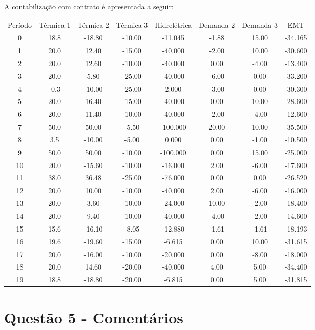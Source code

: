 \documentclass[a4paper,12pt,twoside]{article}
\begin{document}
A contabilização com contrato é apresentada a seguir:
\begin{center}
    \begin{tabular}{ c c c c c c c c }
        Período & Térmica 1  & Térmica 2  & Térmica 3  & Hidrelétrica  & Demanda 2  & Demanda 3 & EMT \\
        0    & 18.8   & -18.80   & -10.00  & -11.045   & -1.88   & 15.00 & -34.165 \\
        1    & 20.0    & 12.40   & -15.00  & -40.000   & -2.00   & 10.00 & -30.600 \\
        2    & 20.0    & 12.60   & -10.00  & -40.000    & 0.00   & -4.00 & -13.400 \\
        3    & 20.0     & 5.80   & -25.00  & -40.000   & -6.00    & 0.00 & -33.200 \\
        4    & -0.3   & -10.00   & -25.00    & 2.000   & -3.00    & 0.00 & -30.300 \\
        5    & 20.0    & 16.40   & -15.00  & -40.000    & 0.00   & 10.00 & -28.600 \\
        6    & 20.0    & 11.40   & -10.00  & -40.000   & -2.00   & -4.00 & -12.600 \\
        7    & 50.0    & 50.00    & -5.50 & -100.000   & 20.00   & 10.00 & -35.500 \\
        8     & 3.5   & -10.00    & -5.00    & 0.000    & 0.00   & -1.00 & -10.500 \\
        9    & 50.0    & 50.00   & -10.00 & -100.000    & 0.00   & 15.00 & -25.000 \\
        10   & 20.0   & -15.60   & -10.00  & -16.000    & 2.00   & -6.00 & -17.600 \\
        11   & 38.0    & 36.48   & -25.00  & -76.000    & 0.00    & 0.00 & -26.520 \\
        12   & 20.0    & 10.00   & -10.00  & -40.000    & 2.00   & -6.00 & -16.000 \\
        13   & 20.0     & 3.60   & -10.00  & -24.000   & 10.00   & -2.00 & -18.400 \\
        14   & 20.0     & 9.40   & -10.00  & -40.000   & -4.00   & -2.00 & -14.600 \\
        15   & 15.6   & -16.10    & -8.05  & -12.880   & -1.61   & -1.61 & -18.193 \\
        16   & 19.6   & -19.60   & -15.00   & -6.615    & 0.00   & 10.00 & -31.615 \\
        17   & 20.0   & -16.00   & -10.00  & -20.000    & 0.00   & -8.00 & -18.000 \\
        18   & 20.0    & 14.60   & -20.00  & -40.000    & 4.00    & 5.00 & -34.400 \\
        19   & 18.8   & -18.80   & -20.00   & -6.815    & 0.00    & 5.00 & -31.815
    \end{tabular}
\end{center}

\section{Questão 5 - Comentários}
\end{document}
